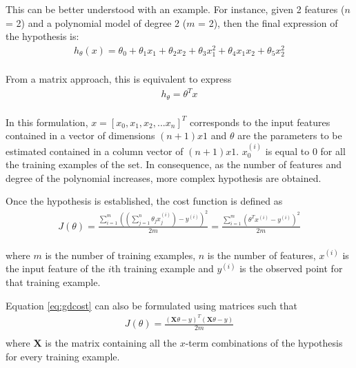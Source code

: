 \documentclass[a4paper, report, oneside, UKenglish]{memoir}
\begin{document}
This can be better understood with an example. For instance, given 2 features ($n$ = 2) and a polynomial model of degree 2 ($m$ = 2), then the final expression of the hypothesis is:
\begin{equation}\label{eq:gdH}
\begin{split}
    h_{\theta}(x) = \theta_{0} + \theta_{1}x_{1} + \theta_{2}x_{2} + \theta_{3}x^{2}_{1} + \theta_{4}x_{1}x_{2} + \theta_{5}x^{2}_{2}\\
\end{split}
\end{equation}

From a matrix approach, this is equivalent to express
\begin{equation}\label{eq:gdHmatrix}
\begin{split}
    h_{\theta} = \theta^{T}x\\
\end{split}
\end{equation}

In this formulation, $x = [x_0,x_1, x_2,...x_n]^{T}$ corresponds to the input features contained in a vector of dimensions $(n+1)x1$ and $\theta$ are the parameters to be estimated contained in a column vector of $(n+1)x1$. $x_0^{(i)}$ is equal to 0 for all the training examples of the set. In consequence, as the number of features and degree of the polynomial increases, more complex hypothesis are obtained.  

Once the hypothesis is established, the cost function is defined as
\begin{equation}\label{eq:gdcost}
\begin{split}
    J(\theta) = \frac{\sum\limits_{i=1}^{m} ((\sum\limits_{j=1}^{n}\theta_{j}x_{j}^{(i)}) - y^{(i)})^{2}}{2m} = \frac{\sum\limits_{i=1}^{m}(\theta^{T}x^{(i)} - y^{(i)})^{2}}{2m}\\
\end{split}
\end{equation}

where $m$ is the number of training examples, $n$ is the number of features, $x^{(i)}$ is the input feature of the $i$th training example and $y^{(i)}$ is the observed point for that training example. 

Equation \eqref{eq:gdcost} can also be formulated using matrices such that
\begin{equation}\label{eq:gdcostmatrix}
\begin{split}
    J(\theta) = \frac{(\textbf{X}\theta - y)^{T}(\textbf{X}\theta - y)}{2m}\\
\end{split}
\end{equation}
where $\textbf{X}$ is the matrix containing all the $x$-term combinations of the hypothesis for every training example.
\end{document}

